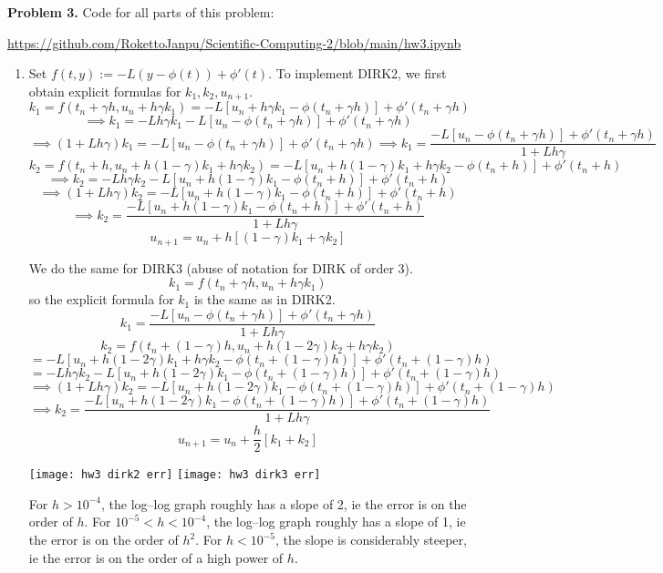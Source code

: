 \documentclass{article}
\def\tbf#1{\textbf{#1}}
\newcommand{\sbr}[1]{\left[#1\right]}
\newcommand{\imp}{\implies}
\begin{document}
\tbf{Problem 3.} Code for all parts of this problem:

\url{https://github.com/RokettoJanpu/Scientific-Computing-2/blob/main/hw3.ipynb}

\begin{enumerate}[label=(\alph*)]
	
\item Set $f(t,y):=-L(y-\phi(t))+\phi'(t)$. To implement DIRK2, we first obtain explicit formulas for $k_1,k_2,u_{n+1}$.
$$k_1 = f(t_n+\gamma h,u_n+h\gamma k_1)
= -L\sbr{u_n+h\gamma k_1-\phi(t_n+\gamma h)}+\phi'(t_n+\gamma h)$$
$$\imp k_1 = -Lh\gamma k_1-L\sbr{u_n-\phi(t_n+\gamma h)}+\phi'(t_n+\gamma h)$$
$$\imp (1+Lh\gamma)k_1 = -L\sbr{u_n-\phi(t_n+\gamma h)}+\phi'(t_n+\gamma h)
\imp k_1 = \frac{-L\sbr{u_n-\phi(t_n+\gamma h)}+\phi'(t_n+\gamma h)}{1+Lh\gamma}$$
$$k_2 = f(t_n+h,u_n+h(1-\gamma)k_1+h\gamma k_2) = -L\sbr{u_n+h(1-\gamma)k_1+h\gamma k_2-\phi(t_n+h)}+\phi'(t_n+h)$$
$$\imp k_2 = -Lh\gamma k_2-L\sbr{u_n+h(1-\gamma)k_1-\phi(t_n+h)}+\phi'(t_n+h)$$
$$\imp (1+Lh\gamma)k_2 = -L\sbr{u_n+h(1-\gamma)k_1-\phi(t_n+h)}+\phi'(t_n+h)$$
$$\imp k_2 = \frac{-L\sbr{u_n+h(1-\gamma)k_1-\phi(t_n+h)}+\phi'(t_n+h)}{1+Lh\gamma}$$
$$u_{n+1} = u_n+h\sbr{(1-\gamma)k_1+\gamma k_2}$$

We do the same for DIRK3 (abuse of notation for DIRK of order 3).
$$k_1 = f(t_n+\gamma h,u_n+h\gamma k_1)$$
so the explicit formula for $k_1$ is the same as in DIRK2.
$$k_1 = \frac{-L\sbr{u_n-\phi(t_n+\gamma h)}+\phi'(t_n+\gamma h)}{1+Lh\gamma}$$
$$k_2 = f(t_n+(1-\gamma)h,u_n+h(1-2\gamma)k_2+h\gamma k_2)$$
$$= -L\sbr{u_n+h(1-2\gamma)k_1+h\gamma k_2-\phi(t_n+(1-\gamma)h)}+\phi'(t_n+(1-\gamma)h)$$
$$= -Lh\gamma k_2-L\sbr{u_n+h(1-2\gamma)k_1-\phi(t_n+(1-\gamma)h)}+\phi'(t_n+(1-\gamma)h)$$
$$\imp (1+Lh\gamma)k_2 = -L\sbr{u_n+h(1-2\gamma)k_1-\phi(t_n+(1-\gamma)h)}+\phi'(t_n+(1-\gamma)h)$$
$$\imp k_2 = \frac{-L\sbr{u_n+h(1-2\gamma)k_1-\phi(t_n+(1-\gamma)h)}+\phi'(t_n+(1-\gamma)h)}{1+Lh\gamma}$$
$$u_{n+1} = u_n+\frac h2[k_1+k_2]$$


\begin{center}
	\texttt{[image: hw3 dirk2 err]}
	\texttt{[image: hw3 dirk3 err]}
\end{center}

For $h>10^{-4}$, the log--log graph roughly has a slope of 2, ie the error is on the order of $h$. For $10^{-5}<h<10^{-4}$, the log--log graph roughly has a slope of 1, ie the error is on the order of $h^2$. For $h<10^{-5}$, the slope is considerably steeper, ie the error is on the order of a high power of $h$.



\end{enumerate}
\end{document}
